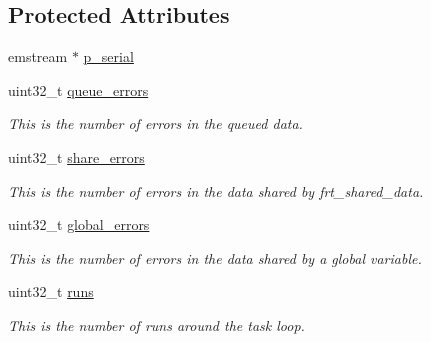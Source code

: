 \subsection*{\-Protected \-Attributes}
\begin{DoxyCompactItemize}
\item 
emstream $\ast$ \hyperlink{classtask__sink_a5be4e7bc37be54c830b3b6506e4db228}{p\-\_\-serial}
\item 
\hypertarget{classtask__sink_a54a5f4b35917d43023ea9cfdbe32c476}{uint32\-\_\-t \hyperlink{classtask__sink_a54a5f4b35917d43023ea9cfdbe32c476}{queue\-\_\-errors}}\label{classtask__sink_a54a5f4b35917d43023ea9cfdbe32c476}

\begin{DoxyCompactList}\small\item\em \-This is the number of errors in the queued data. \end{DoxyCompactList}\item 
\hypertarget{classtask__sink_ab6a9c33c4bd8f29f132aa48d401006c1}{uint32\-\_\-t \hyperlink{classtask__sink_ab6a9c33c4bd8f29f132aa48d401006c1}{share\-\_\-errors}}\label{classtask__sink_ab6a9c33c4bd8f29f132aa48d401006c1}

\begin{DoxyCompactList}\small\item\em \-This is the number of errors in the data shared by frt\-\_\-shared\-\_\-data. \end{DoxyCompactList}\item 
\hypertarget{classtask__sink_a7f9226aad37d173f2a4a8984dd75a2ff}{uint32\-\_\-t \hyperlink{classtask__sink_a7f9226aad37d173f2a4a8984dd75a2ff}{global\-\_\-errors}}\label{classtask__sink_a7f9226aad37d173f2a4a8984dd75a2ff}

\begin{DoxyCompactList}\small\item\em \-This is the number of errors in the data shared by a global variable. \end{DoxyCompactList}\item 
\hypertarget{classtask__sink_a7a6ec91711e4a788668044c5a9f9f96a}{uint32\-\_\-t \hyperlink{classtask__sink_a7a6ec91711e4a788668044c5a9f9f96a}{runs}}\label{classtask__sink_a7a6ec91711e4a788668044c5a9f9f96a}

\begin{DoxyCompactList}\small\item\em \-This is the number of runs around the task loop. \end{DoxyCompactList}\end{DoxyCompactItemize}


